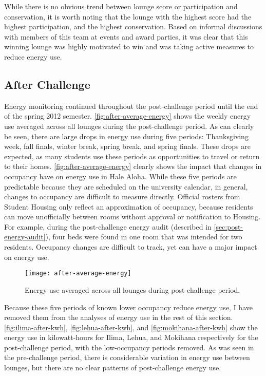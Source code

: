 While there is no obvious trend between lounge score or participation and conservation, it is worth noting that the lounge with the highest score had the highest participation, and the highest conservation. Based on informal discussions with members of this team at events and award parties, it was clear that this winning lounge was highly motivated to win and was taking active measures to reduce energy use.


\subsection{After Challenge}

Energy monitoring continued throughout the post-challenge period until the end of the spring 2012 semester. \autoref{fig:after-average-energy} shows the weekly energy use averaged across all lounges during the post-challenge period. As can clearly be seen, there are large drops in energy use during five periods: Thanksgiving week, fall finals, winter break, spring break, and spring finals. These drops are expected, as many students use these periods as opportunities to travel or return to their homes. \autoref{fig:after-average-energy} clearly shows the impact that changes in occupancy have on energy use in Hale Aloha. While these five periods are predictable because they are scheduled on the university calendar, in general, changes to occupancy are difficult to measure directly. Official rosters from Student Housing only reflect an approximation of occupancy, because residents can move unofficially between rooms without approval or notification to Housing. For example, during the post-challenge energy audit (described in \autoref{sec:post-energy-audit}), four beds were found in one room that was intended for two residents. Occupancy changes are difficult to track, yet can have a major impact on energy use.

\begin{figure}[htbp]
	\centering
	\texttt{[image: after-average-energy]}
	\caption{Energy use averaged across all lounges during post-challenge period.}
	\label{fig:after-average-energy}
\end{figure}

Because these five periods of known lower occupancy reduce energy use, I have removed them from the analyses of energy use in the rest of this section. \autoref{fig:ilima-after-kwh}, \autoref{fig:lehua-after-kwh}, and \autoref{fig:mokihana-after-kwh} show the energy use in kilowatt-hours for Ilima, Lehua, and Mokihana respectively for the post-challenge period, with the low-occupancy periods removed. As was seen in the pre-challenge period, there is considerable variation in energy use between lounges, but there are no clear patterns of post-challenge energy use.

